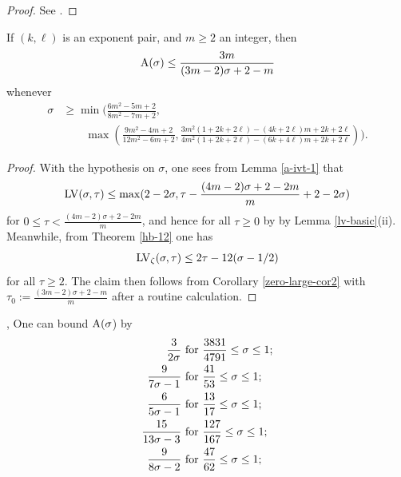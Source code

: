 \begin{proof}  See \cite[(11.74)]{ivic}.
\end{proof}

\begin{lemma}\label{gzd}\cite[(11.76), (11.77)]{ivic} If $(k,\ell)$ is an exponent pair, and $m \geq 2$ an integer, then
$$ \mathrm{A}(\sigma) \leq \frac{3m}{(3m-2)\sigma + 2 - m}$$
whenever
\begin{align*}
\sigma &\geq \min\biggl( \frac{6m^2-5m+2}{8m^2-7m+2},\\
&\qquad \max\left( \frac{9m^2-4m+2}{12m^2-6m+2}, \frac{3m^2(1+2k+2\ell)-(4k+2\ell)m + 2k+2\ell}{4m^2(1+2k+2\ell)-(6k+4\ell)m + 2k+2\ell} \right) \biggr).
\end{align*}
\end{lemma}

\begin{proof} With the hypothesis on $\sigma$, one sees from Lemma \ref{a-ivt-1} that
$$ \mathrm{LV}(\sigma,\tau) \leq \max( 2 - 2 \sigma, \tau - \frac{(4m-2)\sigma + 2-2m}{m} + 2-2\sigma)$$
for $0 \leq \tau < \frac{(4m-2)\sigma + 2-2m}{m}$, and hence for all $\tau \geq 0$ by by Lemma \ref{lv-basic}(ii).  Meanwhile, from Theorem \ref{hb-12} one has
$$\mathrm{LV}_\zeta(\sigma,\tau) \leq 2\tau - 12 (\sigma-1/2)$$
for all $\tau \geq 2$.  The claim then follows from Corollary
\ref{zero-large-cor2} with $\tau_0 := \frac{(3m-2)\sigma+2-m}{m}$ after a routine calculation.
\end{proof}

\begin{corollary}\label{further_ivic_zero}\cite{ivic_exponent_pairs}, \cite[Theorem 11.4]{ivic} One can bound $\mathrm{A}(\sigma$) by
\begin{align*}
 \frac{3}{2\sigma} &\hbox{ for } \frac{3831}{4791} \leq \sigma \leq 1;\\
 \frac{9}{7\sigma-1} &\hbox{ for } \frac{41}{53} \leq \sigma \leq 1; \\
 \frac{6}{5\sigma-1} &\hbox{ for } \frac{13}{17} \leq \sigma \leq 1; \\
 \frac{15}{13\sigma-3} &\hbox{ for } \frac{127}{167} \leq \sigma \leq 1; \\
 \frac{9}{8\sigma-2} &\hbox{ for } \frac{47}{62} \leq \sigma \leq 1;
\end{align*}
\end{corollary}
\literature
{}
\derived
{}

